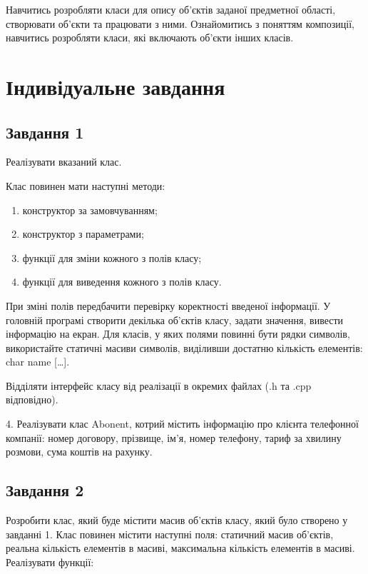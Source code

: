 \documentclass[a4paper, 12pt, oneside]{extarticle}
\begin{document}
\Margins



Навчитись розробляти класи для опису об’єктів заданої предметної
області, створювати об’єкти та працювати з ними. Ознайомитись з поняттям
композиції, навчитись розробляти класи, які включають об’єкти інших класів.

\section*{Індивідуальне завдання}
\subsection*{Завдання 1}

Реалізувати вказаний клас.

Клас повинен мати наступні методи:

\begin{enumerate}
	\item конструктор за замовчуванням;
	\item конструктор з параметрами;
	\item функції для зміни кожного з полів класу;
	\item функції для виведення кожного з полів класу.
\end{enumerate}

При зміні полів передбачити перевірку коректності введеної інформації.
У головній програмі створити декілька об’єктів класу, задати  значення,
вивести інформацію на екран. Для класів, у яких полями повинні бути рядки
символів, використайте статичні масиви символів, виділивши достатню кількість
елементів: char name […].

Відділяти інтерфейс класу від реалізації в окремих файлах (.h та .cpp
відповідно).

4. Реалізувати клас Abonent, котрий містить інформацію про клієнта
телефонної компанії: номер договору, прізвище, ім’я, номер телефону, тариф за
хвилину розмови, сума коштів на рахунку.

\subsection*{Завдання 2}

Розробити клас, який буде містити масив об’єктів класу, який було створено у
завданні 1.
Клас повинен  містити наступні поля: статичний масив об’єктів, реальна
кількість елементів в масиві, максимальна кількість елементів в масиві.
Реалізувати функції:
\end{document}
